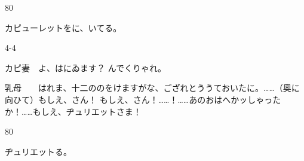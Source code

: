 \documentclass[tate,paper=b6j,jafontsize=9pt]{jlreq}
\begin{document}

\begin{azconvIndented}{8\zw}{0\zw}

カピューレットをに、いてる。

\end{azconvIndented}
\begin{azconvIndented}{4\zw}{-4\zw}

カピ妻　よ、はにゐます？ んでくりゃれ。

乳母　　はれま、十二ののをけますがな、ござれとううておいたに。……（奧に向ひて）もしえ、さん！ もしえ、さん！……！……あのおはへかッしゃったか！……もしえ、ヂュリエットさま！

\end{azconvIndented}
\begin{azconvIndented}{8\zw}{0\zw}

ヂュリエットる。

\end{azconvIndented}
\end{document}
